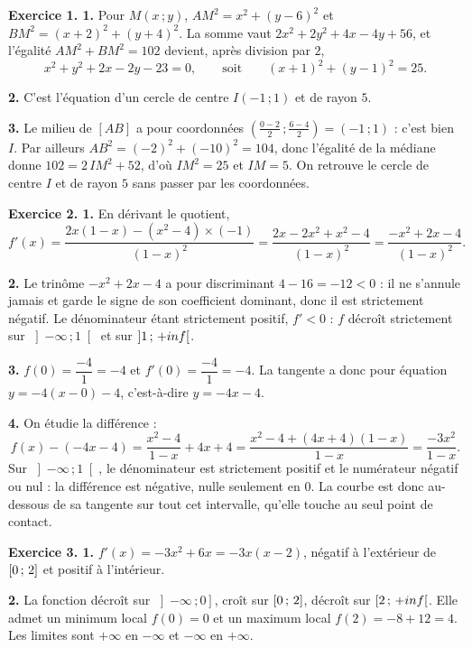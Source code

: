 \begin{corrige}
\textbf{Exercice 1. 1.} Pour $M(x\,;y)$,
$AM^{2} = x^{2}+(y-6)^{2}$ et $BM^{2} = (x+2)^{2}+(y+4)^{2}$. La somme vaut
$2x^{2}+2y^{2}+4x-4y+56$, et l'égalité $AM^{2}+BM^{2} = 102$ devient, après
division par $2$,
\[
  x^{2}+y^{2}+2x-2y-23 = 0,
  \qquad\text{soit}\qquad
  (x+1)^{2}+(y-1)^{2} = 25 .
\]

\textbf{2.} C'est l'équation d'un cercle de centre $I(-1\,;1)$ et de rayon
$5$.

\textbf{3.} Le milieu de $[AB]$ a pour coordonnées
$\left(\frac{0-2}{2}\,;\frac{6-4}{2}\right) = (-1\,;1)$ : c'est bien $I$. Par
ailleurs $AB^{2} = (-2)^{2}+(-10)^{2} = 104$, donc l'égalité de la médiane
donne $102 = 2\,IM^{2}+52$, d'où $IM^{2} = 25$ et $IM = 5$. On retrouve le
cercle de centre $I$ et de rayon $5$ sans passer par les coordonnées.

\medskip
\textbf{Exercice 2. 1.} En dérivant le quotient,
\[
  f'(x) = \frac{2x(1-x)-\left(x^{2}-4\right)\times(-1)}{(1-x)^{2}}
  = \frac{2x-2x^{2}+x^{2}-4}{(1-x)^{2}}
  = \frac{-x^{2}+2x-4}{(1-x)^{2}} .
\]

\textbf{2.} Le trinôme $-x^{2}+2x-4$ a pour discriminant $4-16 = -12<0$ : il
ne s'annule jamais et garde le signe de son coefficient dominant, donc il est
strictement négatif. Le dénominateur étant strictement positif, $f'<0$ :
$f$ décroît strictement sur $\left]-\infty\,;1\right[$ et sur
$\left]1\,;\,+inf\right[$.

\textbf{3.} $f(0) = \dfrac{-4}{1} = -4$ et
$f'(0) = \dfrac{-4}{1} = -4$. La tangente a donc pour équation
$y = -4(x-0)-4$, c'est-à-dire $y = -4x-4$.

\textbf{4.} On étudie la différence :
\[
  f(x)-(-4x-4) = \frac{x^{2}-4}{1-x}+4x+4
  = \frac{x^{2}-4+(4x+4)(1-x)}{1-x}
  = \frac{-3x^{2}}{1-x} .
\]
Sur $\left]-\infty\,;1\right[$, le dénominateur est strictement positif et le
numérateur négatif ou nul : la différence est négative, nulle seulement en
$0$. La courbe est donc au-dessous de sa tangente sur tout cet intervalle,
qu'elle touche au seul point de contact.

\medskip
\textbf{Exercice 3. 1.} $f'(x) = -3x^{2}+6x = -3x(x-2)$, négatif à
l'extérieur de $\left[0\,;\,2\right]$ et positif à l'intérieur.

\textbf{2.} La fonction décroît sur $\left]-\infty\,;0\right]$, croît sur
$\left[0\,;\,2\right]$, décroît sur $\left[2\,;\,+inf\right[$. Elle admet un
minimum local $f(0) = 0$ et un maximum local $f(2) = -8+12 = 4$. Les limites
sont $+\infty$ en $-\infty$ et $-\infty$ en $+\infty$.


\end{corrige}
